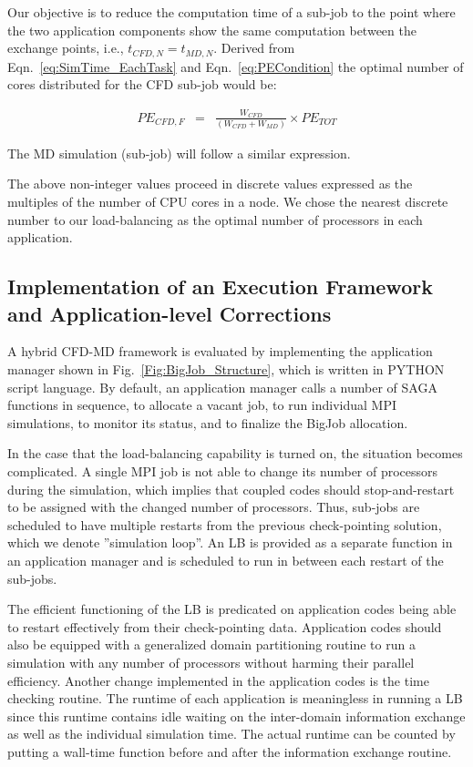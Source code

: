 \documentclass[preprint,12pt]{elsarticle}
\begin{document}
Our objective is to reduce the computation time of a sub-job to the point where the two application components show the same computation between the exchange points, i.e., $t_{CFD,N} = t_{MD,N}$. Derived from Eqn.~\ref{eq:SimTime_EachTask} and Eqn.~\ref{eq:PECondition} the optimal number of cores distributed for the CFD sub-job would be:


\vspace{-.2em}
\footnotesize
\begin{eqnarray}
PE_{CFD,F} & = & \frac {W_{CFD}} {(W_{CFD} + W_{MD})} \times PE_{TOT}
\end{eqnarray}
\normalsize

The MD simulation (sub-job) will follow a similar expression.

The above non-integer values proceed in discrete values expressed as the multiples of the number of CPU cores in a node. We chose the nearest discrete number to our load-balancing as the optimal number of processors in each application.



\subsection{Implementation of an Execution Framework and Application-level Corrections}
\label{sec:computational_hybridruntime}

A hybrid CFD-MD framework is evaluated by implementing the application manager shown in Fig.~\ref{Fig:BigJob_Structure}, which is written in PYTHON script language. By default, an application manager calls a number of SAGA functions in sequence, to allocate a vacant job, to run individual MPI simulations, to monitor its status, and to finalize the BigJob allocation.

In the case that the load-balancing capability is turned on, the situation becomes complicated. A single MPI job is not able to change its number of processors during the simulation, which implies that coupled codes should stop-and-restart to be assigned with the changed number of processors. Thus, sub-jobs are scheduled to have multiple restarts from the previous check-pointing solution, which we denote ''simulation loop''. An LB is provided as a separate function in an application manager and is scheduled to run in between each restart of the sub-jobs.

The efficient functioning of the LB is predicated on application codes being able to restart effectively from their check-pointing data. Application codes should also be equipped with a generalized domain partitioning routine to run a simulation with any number of processors without harming their parallel efficiency. Another change implemented in the application codes is the time checking routine. The runtime of each application is meaningless in running a LB since this runtime contains idle waiting on the inter-domain information exchange as well as the individual simulation time. The actual runtime can be counted by putting a wall-time function before and after the information exchange routine.
\end{document}
